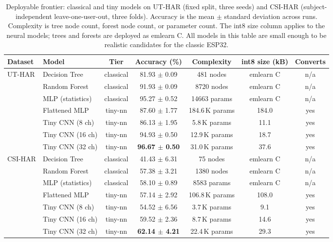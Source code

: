 \documentclass{ieeeaccess}
\begin{document}
\begin{table}[t]
\caption{Deployable frontier: classical and tiny models on UT-HAR (fixed split, three seeds) and CSI-HAR (subject-independent leave-one-user-out, three folds). Accuracy is the mean $\pm$ standard deviation across runs. Complexity is tree node count, forest node count, or parameter count. The int8 size column applies to the neural models; trees and forests are deployed as emlearn C. All models in this table are small enough to be realistic candidates for the classic ESP32.}
\label{tab:frontier}
\centering
\begin{tabular}{llccccc}
\toprule
Dataset & Model & Tier & Accuracy (\%) & Complexity & int8 size (kB) & Converts \\
\midrule
\multirow{7}{*}{UT-HAR}
 & Decision Tree   & classical & 81.93 $\pm$ 0.09 & 481 nodes      & emlearn C & n/a \\
 & Random Forest   & classical & 91.93 $\pm$ 0.09 & 8720 nodes     & emlearn C & n/a \\
 & MLP (statistics)& classical & 95.27 $\pm$ 0.52 & 14663 params & emlearn C & n/a \\
 & Flattened MLP  & tiny-nn   & 87.60 $\pm$ 1.77 & 184.6\,K params & 184.0 & yes \\
 & Tiny CNN (8 ch) & tiny-nn   & 86.13 $\pm$ 1.95 & 5.8\,K params   & 11.1  & yes \\
 & Tiny CNN (16 ch)& tiny-nn   & 94.93 $\pm$ 0.50 & 12.9\,K params  & 18.7  & yes \\
 & Tiny CNN (32 ch)& tiny-nn   & \textbf{96.67 $\pm$ 0.50} & 31.0\,K params  & 37.6  & yes \\
\midrule
\multirow{7}{*}{CSI-HAR}
 & Decision Tree   & classical & 41.43 $\pm$ 6.31 & 75 nodes       & emlearn C & n/a \\
 & Random Forest   & classical & 57.38 $\pm$ 3.21 & 1380 nodes     & emlearn C & n/a \\
 & MLP (statistics)& classical & 58.10 $\pm$ 0.89 & 8583 params    & emlearn C & n/a \\
 & Flattened MLP  & tiny-nn   & 57.14 $\pm$ 2.92 & 106.8\,K params & 108.0 & yes \\
 & Tiny CNN (8 ch) & tiny-nn   & 54.52 $\pm$ 6.56 & 3.7\,K params   & 9.1   & yes \\
 & Tiny CNN (16 ch)& tiny-nn   & 59.52 $\pm$ 2.36 & 8.7\,K params   & 14.6  & yes \\
 & Tiny CNN (32 ch)& tiny-nn   & \textbf{62.14 $\pm$ 4.21} & 22.4\,K params  & 29.3  & yes \\
\bottomrule
\end{tabular}
\end{table}
\end{document}
